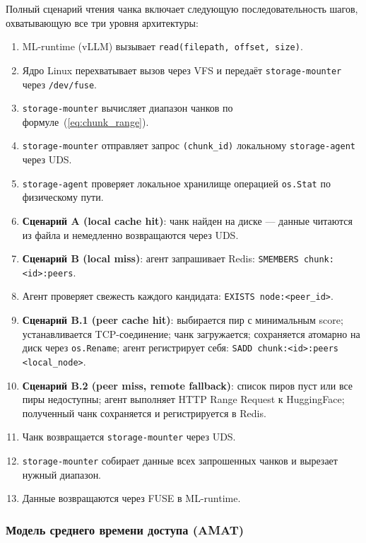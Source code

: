 Полный сценарий чтения чанка включает следующую последовательность шагов, охватывающую все три уровня архитектуры:

\begin{enumerate}[leftmargin=*]
  \item ML-runtime (vLLM) вызывает \texttt{read(filepath, offset, size)}.
  \item Ядро Linux перехватывает вызов через VFS и передаёт \texttt{storage-mounter} через \texttt{/dev/fuse}.
  \item \texttt{storage-mounter} вычисляет диапазон чанков по формуле~(\ref{eq:chunk_range}).
  \item \texttt{storage-mounter} отправляет запрос \texttt{(chunk\_id)} локальному \texttt{storage-agent} через UDS.
  \item \texttt{storage-agent} проверяет локальное хранилище операцией \texttt{os.Stat} по физическому пути.
  \item \textbf{Сценарий A (local cache hit)}: чанк найден на диске --- данные читаются из файла и немедленно возвращаются через UDS.
  \item \textbf{Сценарий B (local miss)}: агент запрашивает Redis: \texttt{SMEMBERS chunk:<id>:peers}.
  \item Агент проверяет свежесть каждого кандидата: \texttt{EXISTS node:<peer\_id>}.
  \item \textbf{Сценарий B.1 (peer cache hit)}: выбирается пир с минимальным score; устанавливается TCP-соединение; чанк загружается; сохраняется атомарно на диск через \texttt{os.Rename}; агент регистрирует себя: \texttt{SADD chunk:<id>:peers <local\_node>}.
  \item \textbf{Сценарий B.2 (peer miss, remote fallback)}: список пиров пуст или все пиры недоступны; агент выполняет HTTP Range Request к HuggingFace; полученный чанк сохраняется и регистрируется в Redis.
  \item Чанк возвращается \texttt{storage-mounter} через UDS.
  \item \texttt{storage-mounter} собирает данные всех запрошенных чанков и вырезает нужный диапазон.
  \item Данные возвращаются через FUSE в ML-runtime.
\end{enumerate}

\subsubsection{Модель среднего времени доступа (AMAT)}


